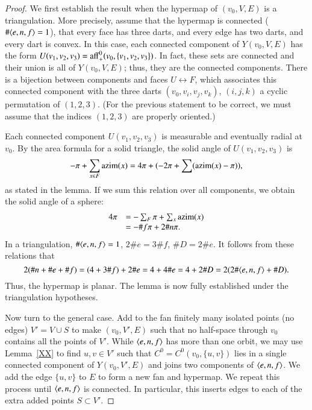 \begin{proof}  We first establish the result when the hypermap
of $(v_0,V,E)$ is a triangulation.  More precisely, assume that the hypermap
is connected ($\#\langle e,n,f\rangle=1$), that every face has three darts,
and every edge has two darts, and every dart is convex.  
In this case, each connected component 
of $Y(v_0,V,E)$ has
the form $U(v_1,v_2,v_3)={\operatorname{aff}}_+^0(v_0,\{v_1,v_2,v_3\})$.  In fact,
these sets are connected and their union is all of $Y(v_0,V,E)$; thus,
they are the connected components.   There is a bijection
between components and faces $U \leftrightarrow F$, which associates this connected component
with the three darts $(v_0,v_i,v_j,v_k)$, $(i,j,k)$ a cyclic permutation
of $(1,2,3)$.  (For the previous statement to be correct, we must assume
that the indices $(1,2,3)$ are properly oriented.)

Each connected component $U(v_1,v_2,v_3)$ is measurable and eventually radial
at $v_0$.  By the area formula for a solid triangle, the solid angle of $U(v_1,v_2,v_3)$
is 
   $$-\pi + \sum_{x\in F} {\operatorname{azim}}(x) = 4\pi + (-2\pi + \sum ({\operatorname{azim}}(x) - \pi)),$$
as stated in the lemma.  If we sum this relation over all components, we obtain
the solid angle of a sphere:
   \begin{equation}\label{eqn:euler}
   \begin{array}{lll}
   4\pi &= -\sum_{F} \pi + \sum_{x} {\operatorname{azim}}(x)\\
        &= -\#f \pi + 2 \# n \pi.
   \end{array}
   \end{equation}
In a triangulation, $\#\langle e,n,f\rangle=1$, $2 \# e  = 3\#f$, $\# D = 2 \#e$.
It follows from these relations that
   $$
   2(\#n + \# e + \# f) = (4 + 3\#f) + 2\#e = 4 + 4\# e = 4 + 2 \# D = 2(2\#\langle e,n,f\rangle+\# D).
   $$
Thus, the hypermap is planar.  The lemma is now fully established under the
triangulation hypotheses.

Now turn to the general case.  Add to the fan finitely many isolated
points (no edges) $V' = V\cup S$ to make $(v_0,V',E)$ such that no half-space
through $v_0$ contains all the points of $V'$.    While $\langle e,n,f\rangle$ has
more than one orbit, we may use Lemma~\ref{XX} to find $u,v\in V'$ such
that $C^0=C^0(v_0,\{u,v\})$ lies in a single connected component of $Y(v_0,V',E)$ and
joins two components of $\langle e,n,f\rangle$.  We add the edge $\{u,v\}$ to $E$ to form
a new fan and hypermap.
We repeat this process until $\langle e,n,f\rangle$ is connected.  In particular, this
inserts edges to each of the extra added points $S\subset V'$.


\end{proof}
